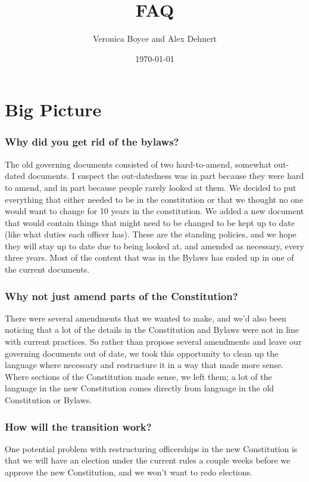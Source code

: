 \documentclass{article}
\title{FAQ}
\author{Veronica Boyce and Alex Dehnert}
\date{\today}
\begin{document}
\maketitle

\section{Big Picture}

\subsubsection*{Why did you get rid of the bylaws?}
The old governing documents consisted of two hard-to-amend, somewhat out-dated documents. I suspect the out-datedness was in part because they were hard to amend, and in part because people rarely looked at them. We decided to put everything that either needed to be in the constitution or that we thought no one would want to change for 10 years in the constitution. We added a new document that would contain things that might need to be changed to be kept up to date (like what duties each officer has). These are the standing policies, and we hope they will stay up to date due to being looked at, and amended as necessary, every three years. Most of the content that was in the Bylaws has ended up in one of the current documents.

\subsubsection*{Why not just amend parts of the Constitution?}
There were several amendments that we wanted to make, and we'd also been noticing that a lot of the details in the Constitution and Bylaws were not in line with current practices. So rather than propose several amendments and leave our governing documents out of date, we took this opportunity to clean up the language where necessary and restructure it in a way that made more sense. Where sections of the Constitution made sense, we left them; a lot of the language in the new Constitution comes directly from language in the old Constitution or Bylaws.

\subsubsection*{How will the transition work?}
One potential problem with restructuring officerships in the new Constitution is that we will have an election under the current rules a couple weeks before we approve the new Constitution, and we won't want to redo elections.
\end{document}

